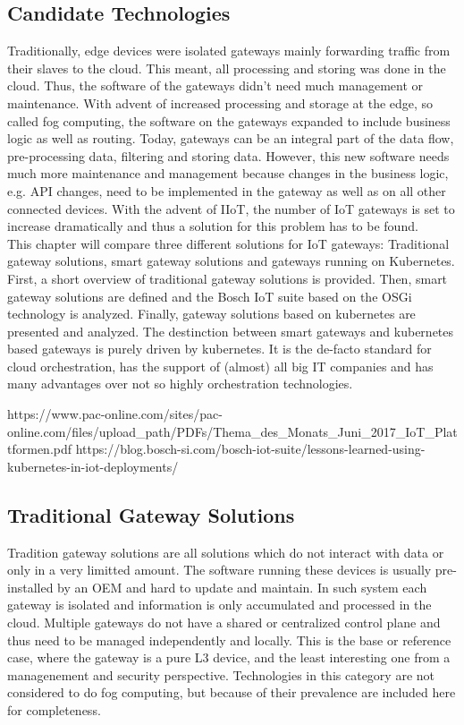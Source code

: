 \subsection{Candidate Technologies}
Traditionally, edge devices were isolated gateways mainly forwarding traffic from their slaves to the cloud. This meant, all processing and storing was done in the cloud. Thus, the software of the gateways didn't need much management or maintenance. With advent of increased processing and storage at the edge, so called fog computing, the software on the gateways expanded to include business logic as well as routing. Today, gateways can be an integral part of the data flow, pre-processing data, filtering and storing data. However, this new software needs much more maintenance and management because changes in the business logic, e.g. API changes, need to be implemented in the gateway as well as on all other connected devices. With the advent of IIoT, the number of IoT gateways is set to increase dramatically and thus a solution for this problem has to be found.\\ This chapter will compare three different solutions for IoT gateways: Traditional gateway solutions, smart gateway solutions and gateways running on Kubernetes. First, a short overview of traditional gateway solutions is provided. Then, smart gateway solutions are defined and the Bosch IoT suite based on the OSGi technology is analyzed. Finally, gateway solutions based on kubernetes are presented and analyzed. The destinction between smart gateways and kubernetes based gateways is purely driven by kubernetes. It is the de-facto standard for cloud orchestration, has the support of (almost) all big IT companies and has many advantages over not so highly orchestration technologies.

https://www.pac-online.com/sites/pac-online.com/files/upload_path/PDFs/Thema_des_Monats_Juni_2017_IoT_Plattformen.pdf
https://blog.bosch-si.com/bosch-iot-suite/lessons-learned-using-kubernetes-in-iot-deployments/


\subsection{Traditional Gateway Solutions}
Tradition gateway solutions are all solutions which do not interact with data or only in a very limitted amount. The software running these devices is usually pre-installed by an OEM and hard to update and maintain. In such system each gateway is isolated and information is only accumulated and processed in the cloud. Multiple gateways do not have a shared or centralized control plane and thus need to be managed independently and locally. This is the base or reference case, where the gateway is a pure L3 device, and the least interesting one from a managenement and security perspective. Technologies in this category are not considered to do fog computing, but because of their prevalence are included here for completeness.


